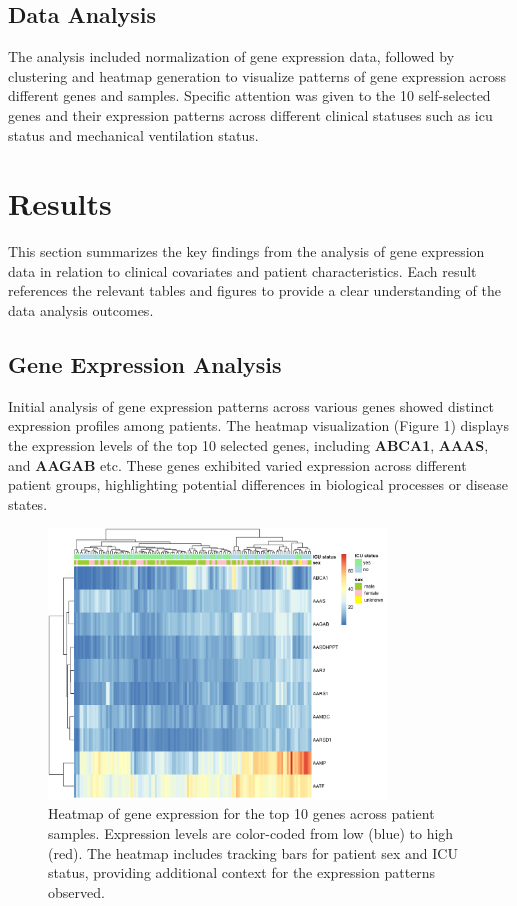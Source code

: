 \documentclass{article}
\begin{document}
\subsection{Data Analysis}

The analysis included normalization of gene expression data, followed by clustering and heatmap generation to visualize patterns of gene expression across different genes and samples. Specific attention was given to the 10 self-selected genes and their expression patterns across different clinical statuses such as icu status and mechanical ventilation status.
\section{Results}

This section summarizes the key findings from the analysis of gene expression data in relation to clinical covariates and patient characteristics. Each result references the relevant tables and figures to provide a clear understanding of the data analysis outcomes.

\subsection{Gene Expression Analysis}

Initial analysis of gene expression patterns across various genes showed distinct expression profiles among patients. The heatmap visualization (Figure 1) displays the expression levels of the top 10 selected genes, including \textbf{ABCA1}, \textbf{AAAS}, and \textbf{AAGAB} etc. These genes exhibited varied expression across different patient groups, highlighting potential differences in biological processes or disease states.

\begin{figure}[H]
    \centering
    \includegraphics[width=0.8\textwidth]{heatmap_Final_Submission.png}
    \caption{Heatmap of gene expression for the top 10 genes across patient samples. Expression levels are color-coded from low (blue) to high (red). The heatmap includes tracking bars for patient sex and ICU status, providing additional context for the expression patterns observed.}
    \label{fig:heatmap}
\end{figure}
\end{document}
